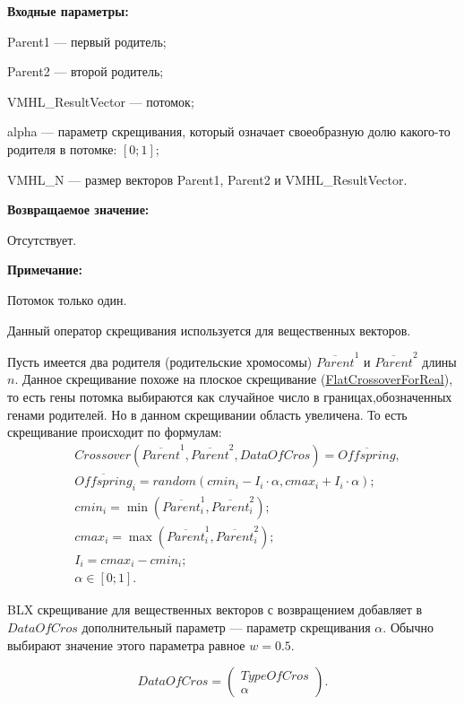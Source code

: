 \documentclass[a4paper,12pt]{article}
\begin{document}
\textbf{Входные параметры:}
 
Parent1 --- первый родитель;
 
Parent2 --- второй родитель;
 
VMHL\_ResultVector --- потомок;

alpha --- параметр скрещивания, который означает своеобразную долю какого-то родителя в потомке: $[0;1]$;
 
VMHL\_N --- размер векторов Parent1, Parent2 и VMHL\_ResultVector.

\textbf{Возвращаемое значение:}

 Отсутствует.
 
\textbf{ Примечание:}

Потомок только один.
 
Данный оператор скрещивания используется для вещественных векторов.

Пусть имеется два родителя (родительские хромосомы) $ \overline{Parent}^1 $ и $ \overline{Parent}^2$ длины $n$. Данное скрещивание похоже на плоское скрещивание (\hyperref[SetOfOperatorsAlgorithms:FlatCrossoverForReal]{FlatCrossoverForReal}), то есть гены потомка выбираются как случайное число в границах,обозначенных генами родителей. Но в данном скрещивании область увеличена. То есть скрещивание происходит по формулам:
\begin{align}
\label{SetOfOperatorsAlgorithms:eq:BLXCrossoverForReal}
&Crossover \left( \overline{Parent}^1, \overline{Parent}^2, DataOfCros\right)= \overline{Offspring}, \\
& \overline{Offspring}_i=random\left(cmin_i-I_i\cdot \alpha, cmax_i+I_i\cdot \alpha\right);\nonumber\\
& cmin_i = \min\left(\overline{Parent}^1_i, \overline{Parent}^2_i \right);\nonumber\\
& cmax_i = \max\left(\overline{Parent}^1_i, \overline{Parent}^2_i \right);\nonumber\\
& I_i = cmax_i-cmin_i;\nonumber\\
&\alpha\in \left[ 0; 1\right].\nonumber
\end{align}

BLX скрещивание для вещественных векторов с возвращением добавляет в $ DataOfCros $ дополнительный параметр --- параметр скрещивания $ \alpha $. Обычно выбирают значение этого параметра равное $ w=0.5 $.

\begin{equation}
DataOfCros=\left( \begin{array}{c} TypeOfCros \\ \alpha \end{array} \right).
\end{equation}
\end{document}
